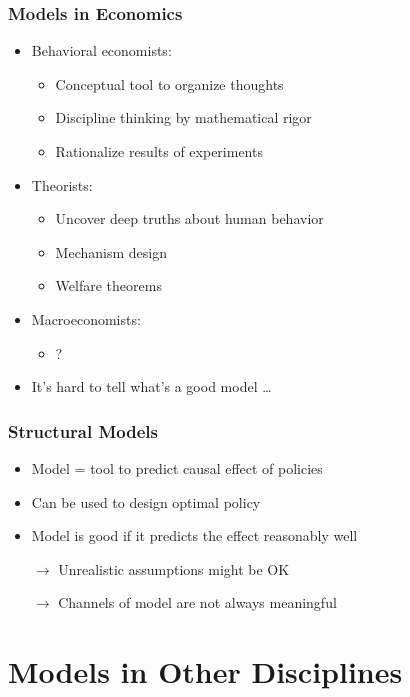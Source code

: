 \documentclass[11pt]{beamer}
\begin{document}
\begin{frame}[c]\frametitle{Models in Economics}
    \begin{itemize}
        \pause
        \item Behavioral economists:
        \begin{itemize}
            \item Conceptual tool to organize thoughts
            \item Discipline thinking by mathematical rigor
            \item Rationalize results of experiments
        \end{itemize}
        \item Theorists:
        \begin{itemize}
            \item Uncover deep truths about human behavior
            \item Mechanism design
            \item Welfare theorems
        \end{itemize}
        \item Macroeconomists:
        \begin{itemize}
            \item ?
        \end{itemize}
        \item It's hard to tell what's a good model \ldots
    \end{itemize}
\end{frame}


\begin{frame}[c]\frametitle{Structural Models}
    \begin{itemize}
        \item Model = tool to predict causal effect of policies
        \item Can be used to design optimal policy
        \item Model is good if it predicts the effect reasonably well
        \item [$\rightarrow$] Unrealistic assumptions might be OK
        \item [$\rightarrow$] Channels of model are not always meaningful
    \end{itemize}
\end{frame}




\section{Models in Other Disciplines}
\end{document}

